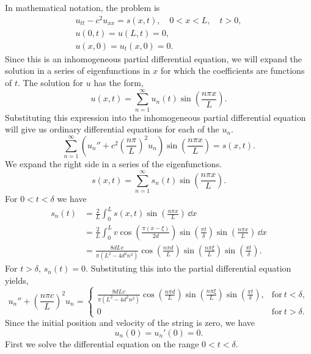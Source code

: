 {%
\begin{Solution}
  \label{solution piano string time dependent forcing}
  In mathematical notation, the problem is
  \begin{gather*}
    u_{t t} - c^2 u_{x x} = s(x, t), \quad 0 < x < L, \quad t > 0, \\
    u(0, t) = u(L, t) = 0, \\
    u(x, 0) = u_t(x, 0) = 0.
  \end{gather*}
  Since this is an 
  inhomogeneous partial differential equation, we will expand the solution in a 
  series of eigenfunctions in $x$ for which the coefficients are functions
  of $t$.   The solution for $u$ has the form,
  \[
  u(x, t) = \sum_{n=1}^\infty u_n(t) \sin\left( \frac{n \pi x}{L} \right).
  \]
  Substituting this expression into the inhomogeneous partial differential 
  equation will give us ordinary differential equations for each of the $u_n$.  
  \[
  \sum_{n=1}^\infty \left( u_n'' + c^2 \left( \frac{n \pi}{L} \right)^2 u_n \right)
  \sin\left( \frac{n \pi x}{L} \right) = s(x, t).
  \]
  We expand the right side in a series of the eigenfunctions.
  \[
  s(x, t) = \sum_{n=1}^\infty s_n(t) \sin\left( \frac{n \pi x}{L} \right).
  \]
  For $0 < t < \delta$ we have
  \begin{align*}
    s_n(t) &= \frac{2}{L} \int_0^L s(x, t) \sin\left( \frac{n \pi x}{L} \right) 
    \,\dd x \\
    &= \frac{2}{L} \int_0^L v \cos\left( \frac{\pi(x-\xi)}{2d} \right)
    \sin\left( \frac{\pi t}{\delta} \right)
    \sin\left( \frac{n \pi x}{L} \right) \,\dd x \\
    &= \frac{8 d L v}{\pi (L^2 - 4 d^2 n^2)}
    \cos\left( \frac{n \pi d}{L} \right)
    \sin\left( \frac{n \pi \xi}{L} \right)
    \sin\left( \frac{\pi t}{\delta} \right).
  \end{align*}
  For $t > \delta$, $s_n(t) = 0$.  Substituting this into the partial 
  differential equation yields,
  \[
  u_n'' + \left( \frac{n \pi c}{L} \right)^2 u_n = 
  \begin{cases}
    \frac{8 d L v}{\pi (L^2 - 4 d^2 n^2)}
    \cos\left( \frac{n \pi d}{L} \right)
    \sin\left( \frac{n \pi \xi}{L} \right)
    \sin\left( \frac{\pi t}{\delta} \right),
    &\mathrm{for}\ t < \delta, \\
    0 &\mathrm{for}\ t > \delta.
  \end{cases}
  \]
  Since the initial position and velocity of the string is zero, we have
  \[
  u_n(0) = u_n'(0) = 0.
  \]
  First we solve the differential equation on the range $0 < t < \delta$.

\end{Solution}}
